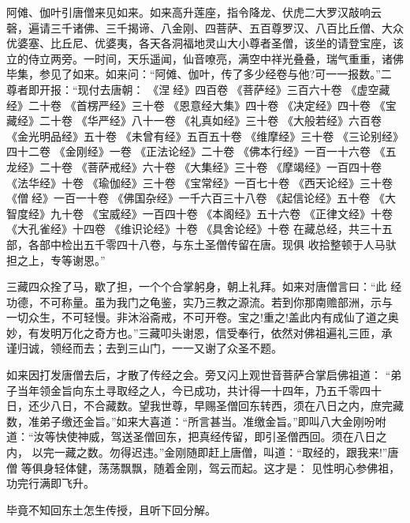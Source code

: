 阿傩、伽叶引唐僧来见如来。如来高升莲座，指令降龙、伏虎二大罗汉敲响云
磬，遍请三千诸佛、三千揭谛、八金刚、四菩萨、五百尊罗汉、八百比丘僧、大众
优婆塞、比丘尼、优婆夷，各天各洞福地灵山大小尊者圣僧，该坐的请登宝座，该
立的侍立两旁。一时间，天乐遥闻，仙音嘹亮，满空中祥光叠叠，瑞气重重，诸佛
毕集，参见了如来。如来问：“阿傩、伽叶，传了多少经卷与他?可一一报数。”二
尊者即开报：“现付去唐朝：
《涅经》四百卷
《菩萨经》三百六十卷
《虚空藏经》二十卷
《首楞严经》三十卷
《恩意经大集》四十卷
《决定经》四十卷
《宝藏经》二十卷
《华严经》八十一卷
《礼真如经》三十卷
《大般若经》六百卷
《金光明品经》五十卷
《未曾有经》五百五十卷
《维摩经》三十卷
《三论别经》四十二卷
《金刚经》一卷
《正法论经》二十卷
《佛本行经》一百一十六卷
《五龙经》二十卷
《菩萨戒经》六十卷
《大集经》三十卷
《摩竭经》一百四十卷
《法华经》十卷
《瑜伽经》三十卷
《宝常经》一百七十卷
《西天论经》三十卷
《僧经》一百一十卷
《佛国杂经》一千六百三十八卷
《起信论经》五十卷
《大智度经》九十卷
《宝威经》一百四十卷
《本阁经》五十六卷
《正律文经》十卷
《大孔雀经》十四卷
《维识论经》十卷
《具舍论经》十卷
在藏总经，共三十五部，各部中检出五千零四十八卷，与东土圣僧传留在唐。现俱
收拾整顿于人马驮担之上，专等谢恩。”

三藏四众拴了马，歇了担，一个个合掌躬身，朝上礼拜。如来对唐僧言曰：“此
经功德，不可称量。虽为我门之龟鉴，实乃三教之源流。若到你那南赡部洲，示与
一切众生，不可轻慢。非沐浴斋戒，不可开卷。宝之!重之!盖此内有成仙了道之奥
妙，有发明万化之奇方也。”三藏叩头谢恩，信受奉行，依然对佛祖遍礼三匝，承
谨归诚，领经而去；去到三山门，一一又谢了众圣不题。

如来因打发唐僧去后，才散了传经之会。旁又闪上观世音菩萨合掌启佛祖道：
“弟子当年领金旨向东土寻取经之人，今已成功，共计得一十四年，乃五千零四十
日，还少八日，不合藏数。望我世尊，早赐圣僧回东转西，须在八日之内，庶完藏
数，准弟子缴还金旨。”如来大喜道：“所言甚当。准缴金旨。”即叫八大金刚吩咐
道：“汝等快使神威，驾送圣僧回东，把真经传留，即引圣僧西回。须在八日之内，
以完一藏之数。勿得迟违。”金刚随即赶上唐僧，叫道：“取经的，跟我来!”唐僧
等俱身轻体健，荡荡飘飘，随着金刚，驾云而起。这才是：
见性明心参佛祖，功完行满即飞升。

毕竟不知回东土怎生传授，且听下回分解。